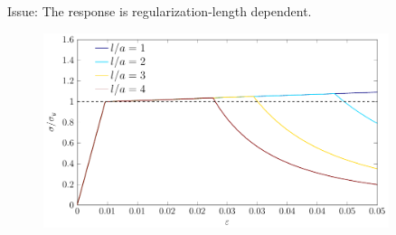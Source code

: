 \begin{frame}
\begin{overlayarea}{\textwidth}{0.4\textwidth}
{\begin{columns}
\begin{column}{0.6\textwidth}
\begin{columns}
            \begin{column}[t]{0.5\textwidth}
              Issue: The response is regularization-length dependent.
              \begin{figure}
                \centering
                \includegraphics[width=0.9\textwidth]{theory/figures/Chapter5-homogenized-compare_degradation-EPPD_quad}
              \end{figure}
            \end{column}
          \end{columns}
        \end{column}
      \end{columns}
    }
    
\end{overlayarea}
\end{frame}
